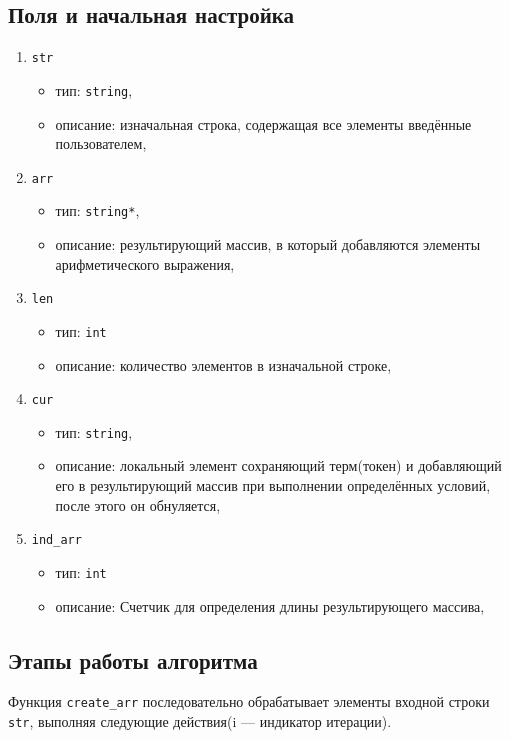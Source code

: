 \subsection*{Поля и начальная настройка}
\begin{enumerate}
	\item \texttt{str}
	\begin{itemize}
		\item тип: \texttt{string},
		\item описание: изначальная строка, содержащая все элементы введённые пользователем,
	\end{itemize}
	
	\item \texttt{arr}
	\begin{itemize}
		\item тип: \texttt{string*},
		\item описание: результирующий массив, в который добавляются элементы арифметического выражения,
	\end{itemize}
	
	\item \texttt{len}
	\begin{itemize}
		\item тип: \texttt{int}
		\item описание: количество элементов в изначальной строке,
	\end{itemize}
	
	\item \texttt{cur}
	\begin{itemize}
		\item тип: \texttt{string},
		\item описание: локальный элемент сохраняющий терм(токен) и добавляющий его в результирующий массив при выполнении определённых условий, после этого он обнуляется,
	\end{itemize}
	
	\item \texttt{ind\_arr}
	\begin{itemize}
		\item тип: \texttt{int}
		\item описание: Счетчик для определения длины результирующего массива,
	\end{itemize}
\end{enumerate}

\subsection*{Этапы работы алгоритма}
Функция \texttt{create\_arr} последовательно обрабатывает элементы входной строки \texttt{str}, выполняя следующие действия(i --- индикатор итерации).

